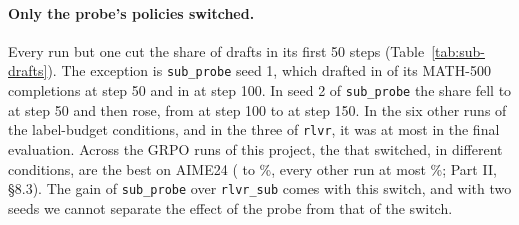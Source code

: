 \paragraph{Only the probe's policies switched.} Every run but one cut the share of drafts in its first 50 steps
(Table~\ref{tab:sub-drafts}). The exception is \texttt{sub\_probe} seed 1, which drafted in
 of its MATH-500 completions at step 50 and in  at step 100.
In seed 2 of \texttt{sub\_probe} the share fell to  at step 50 and then rose, from
 at step 100 to  at step 150. In the six other runs of the
label-budget conditions, and in the three of \texttt{rlvr}, it was at most  in the final
evaluation. Across the  GRPO runs of this project, the  that switched, in
 different conditions, are the  best on AIME24 ( to \%, every other
run at most \%; Part II, \S8.3). The gain of \texttt{sub\_probe} over \texttt{rlvr\_sub} comes
with this switch, and with two seeds we cannot separate the effect of the probe from that of the switch.

\begin{table}[t]
\centering\small

\caption{The share of MATH-500 completions that open with an informal draft, at each periodic evaluation (greedy, every
50 steps) and in the final evaluation, per run, with the final accuracies.}
\label{tab:sub-drafts}
\end{table}

